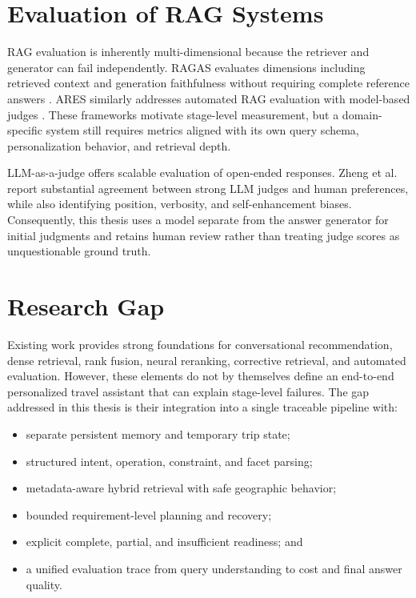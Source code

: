 \section{Evaluation of RAG Systems}

RAG evaluation is inherently multi-dimensional because the retriever and
generator can fail independently. RAGAS evaluates dimensions including
retrieved context and generation faithfulness without requiring complete
reference answers \cite{es2024ragas}. ARES similarly addresses automated RAG
evaluation with model-based judges \cite{saadfalcon2024ares}. These frameworks
motivate stage-level measurement, but a domain-specific system still requires
metrics aligned with its own query schema, personalization behavior, and
retrieval depth.

LLM-as-a-judge offers scalable evaluation of open-ended responses. Zheng et
al.~\cite{zheng2023llmjudge} report substantial agreement between strong LLM
judges and human preferences, while also identifying position, verbosity, and
self-enhancement biases. Consequently, this thesis uses a model separate from
the answer generator for initial judgments and retains human review rather than
treating judge scores as unquestionable ground truth.

\section{Research Gap}

Existing work provides strong foundations for conversational recommendation,
dense retrieval, rank fusion, neural reranking, corrective retrieval, and
automated evaluation. However, these elements do not by themselves define an
end-to-end personalized travel assistant that can explain stage-level failures.
The gap addressed in this thesis is their integration into a single traceable
pipeline with:

\begin{itemize}
    \item separate persistent memory and temporary trip state;
    \item structured intent, operation, constraint, and facet parsing;
    \item metadata-aware hybrid retrieval with safe geographic behavior;
    \item bounded requirement-level planning and recovery;
    \item explicit complete, partial, and insufficient readiness; and
    \item a unified evaluation trace from query understanding to cost and final
    answer quality.
\end{itemize}

